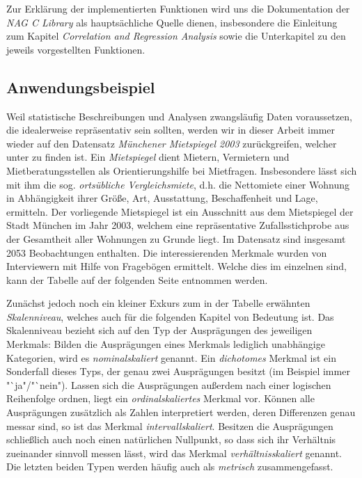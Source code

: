 Zur Erklärung der implementierten Funktionen wird uns die Dokumentation der {\it NAG C Library} als hauptsächliche Quelle dienen, insbesondere die Einleitung zum Kapitel {\it Correlation and Regression Analysis} \cite{nag:intro} sowie die Unterkapitel zu den jeweils vorgestellten Funktionen.

\subsection{Anwendungsbeispiel}
\label{sec:beispiel}

Weil statistische Beschreibungen und Analysen zwangsläufig Daten voraussetzen, die idealerweise repräsentativ sein sollten, werden wir in dieser Arbeit immer wieder auf den Datensatz {\it Münchener Mietspiegel 2003} zurückgreifen, welcher unter \cite{Fahrmeir2011} zu finden ist. Ein {\it Mietspiegel} dient Mietern, Vermietern und Mietberatungsstellen als Orientierungshilfe bei Mietfragen. Insbesondere lässt sich mit ihm die sog. {\it ortsübliche Vergleichsmiete}, d.h. die Nettomiete einer Wohnung in Abhängigkeit ihrer Größe, Art, Ausstattung, Beschaffenheit und Lage, ermitteln. Der vorliegende Mietspiegel ist ein Ausschnitt aus dem Mietspiegel der Stadt München im Jahr 2003, welchem eine repräsentative Zufallsstichprobe aus der Gesamtheit aller Wohnungen zu Grunde liegt.  Im Datensatz sind insgesamt 2053 Beobachtungen enthalten. Die interessierenden Merkmale wurden von Interviewern mit Hilfe von Fragebögen ermittelt. Welche dies im einzelnen sind, kann der Tabelle auf der folgenden Seite entnommen werden.

Zunächst jedoch noch ein kleiner Exkurs zum in der Tabelle erwähnten {\it Skalenniveau}, welches auch für die folgenden Kapitel von Bedeutung ist. Das Skalenniveau bezieht sich auf den Typ der Ausprägungen des jeweiligen Merkmals: Bilden die Ausprägungen eines Merkmals lediglich unabhängige Kategorien, wird es {\it nominalskaliert} genannt. Ein {\it dichotomes} Merkmal ist ein Sonderfall dieses Typs, der genau zwei Ausprägungen besitzt (im Beispiel immer "`ja"/"`nein"). Lassen sich die Ausprägungen außerdem nach einer logischen Reihenfolge ordnen, liegt ein {\it ordinalskaliertes} Merkmal vor. Können alle Ausprägungen zusätzlich als Zahlen interpretiert werden, deren Differenzen genau messar sind, so ist das Merkmal {\it intervallskaliert}. Besitzen die Ausprägungen schließlich auch noch einen natürlichen Nullpunkt, so dass sich ihr Verhältnis zueinander sinnvoll messen lässt, wird das Merkmal {\it verhältnisskaliert} genannt. Die letzten beiden Typen werden häufig auch als {\it metrisch} zusammengefasst.\\

